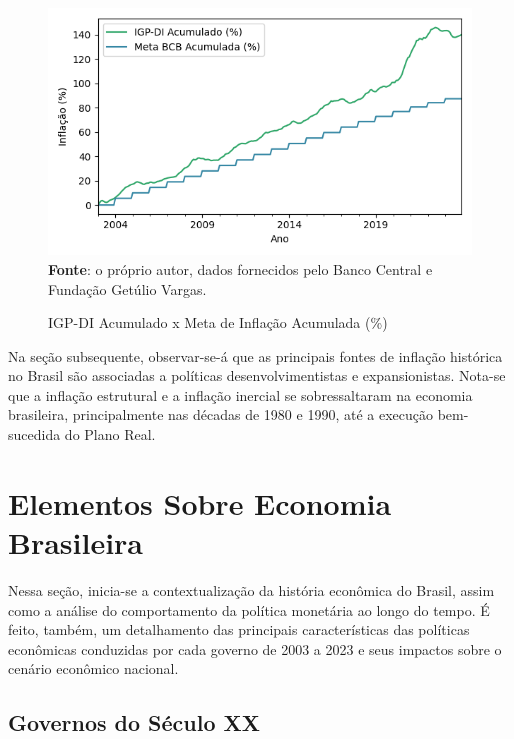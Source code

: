 \documentclass[12pt,oneside,a4paper,chapter=TITLE,english,brazil,sumario=abnt-6027-2012]{abntex2}
\begin{document}
\begin{figure}[H]
	
	\caption{IGP-DI Acumulado x Meta de Inflação Acumulada (\%)}
	
	\includegraphics[]{fig/igpdi_96_24_t.png}\\
	\footnotesize \textbf{Fonte}: o próprio autor, dados fornecidos pelo Banco Central e Fundação Getúlio Vargas.
	
	\label{fig:igpdiacum}
\end{figure}

Na seção subsequente, observar-se-á que as principais fontes de inflação histórica no Brasil são associadas a políticas desenvolvimentistas e expansionistas. Nota-se que a inflação estrutural e a inflação inercial se sobressaltaram na economia brasileira, principalmente nas décadas de 1980 e 1990, até a execução bem-sucedida do Plano Real.


\chapter{Elementos Sobre Economia Brasileira}

Nessa seção, inicia-se a contextualização da história econômica do Brasil, assim como a análise do comportamento da política monetária ao longo do tempo. É feito, também, um detalhamento das principais características das políticas econômicas conduzidas por cada governo de 2003 a 2023 e seus impactos sobre o cenário econômico nacional.

\section{Governos do Século XX}

\end{document}
